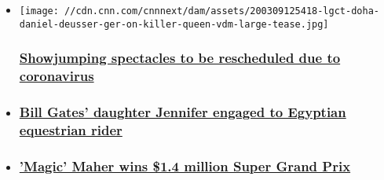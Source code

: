 \begin{itemize}
\item
  \href{/2020/03/12/sport/coronavirus-longines-tour-postponed-spt-intl/index.html}{}

  \texttt{[image: //cdn.cnn.com/cnnnext/dam/assets/200309125418-lgct-doha-daniel-deusser-ger-on-killer-queen-vdm-large-tease.jpg]}

  \hypertarget{showjumping-spectacles-to-be-rescheduled-due-to-coronavirus}{%
  \subsubsection{\texorpdfstring{\href{/2020/03/12/sport/coronavirus-longines-tour-postponed-spt-intl/index.html}{Showjumping
  spectacles to be rescheduled due to
  coronavirus}}{Showjumping spectacles to be rescheduled due to coronavirus}}\label{showjumping-spectacles-to-be-rescheduled-due-to-coronavirus}}
\item
  \hypertarget{bill-gates-daughter-jennifer-engaged-to-egyptian-equestrian-rider}{%
  \subsubsection{\texorpdfstring{\href{/2020/01/30/sport/jennifer-gates-engaged-nayel-nassar-intl-scli-spt/index.html}{Bill
  Gates' daughter Jennifer engaged to Egyptian equestrian
  rider}}{Bill Gates' daughter Jennifer engaged to Egyptian equestrian rider}}\label{bill-gates-daughter-jennifer-engaged-to-egyptian-equestrian-rider}}
\item
  \hypertarget{magic-maher-wins-14-million-super-grand-prix}{%
  \subsubsection{\texorpdfstring{\href{/2019/11/23/sport/maher-wins-lgct-prague/index.html}{'Magic'
  Maher wins \$1.4 million Super Grand
  Prix}}{'Magic' Maher wins \$1.4 million Super Grand Prix}}\label{magic-maher-wins-14-million-super-grand-prix}}
\end{itemize}


